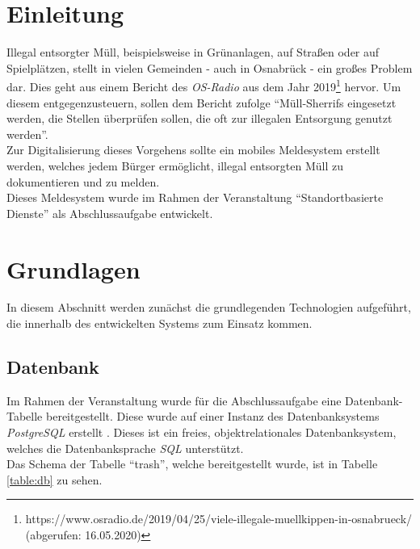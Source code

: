 \documentclass[a4paper, 11pt, DIV=11, listof=numbered, numbers=noenddot]{scrartcl}
\begin{document}
	\section{Einleitung}
	Illegal entsorgter Müll, beispielsweise in Grünanlagen, auf Straßen oder auf Spielplätzen, stellt in vielen Gemeinden - auch in Osnabrück - ein großes Problem dar. Dies geht aus einem Bericht des \textit{OS-Radio} aus dem Jahr 2019\footnote{\label{note:trash}https://www.osradio.de/2019/04/25/viele-illegale-muellkippen-in-osnabrueck/ (abgerufen: 16.05.2020)} hervor.
	Um diesem entgegenzusteuern, sollen dem Bericht zufolge \enquote{Müll-Sherrifs eingesetzt werden, die Stellen überprüfen sollen, die oft zur illegalen Entsorgung genutzt werden}.\\
	Zur Digitalisierung dieses Vorgehens sollte ein mobiles Meldesystem erstellt werden, welches jedem Bürger ermöglicht, illegal entsorgten Müll zu dokumentieren und zu melden.\\
	Dieses Meldesystem wurde im Rahmen der Veranstaltung \enquote{Standortbasierte Dienste} als Abschlussaufgabe entwickelt.

	\section{Grundlagen}
	In diesem Abschnitt werden zunächst die grundlegenden Technologien aufgeführt, die innerhalb des entwickelten Systems zum Einsatz kommen.

	\subsection{Datenbank}
	Im Rahmen der Veranstaltung wurde für die Abschlussaufgabe eine Datenbank-Tabelle bereitgestellt.
	Diese wurde auf einer Instanz des Datenbanksystems \textit{PostgreSQL} erstellt \cite{@Postgresql}.
	Dieses ist ein freies, objektrelationales Datenbanksystem, welches die Datenbanksprache \textit{SQL} unterstützt.\\
	Das Schema der Tabelle \enquote{trash}, welche bereitgestellt wurde, ist in Tabelle \ref{table:db} zu sehen.
\end{document}
